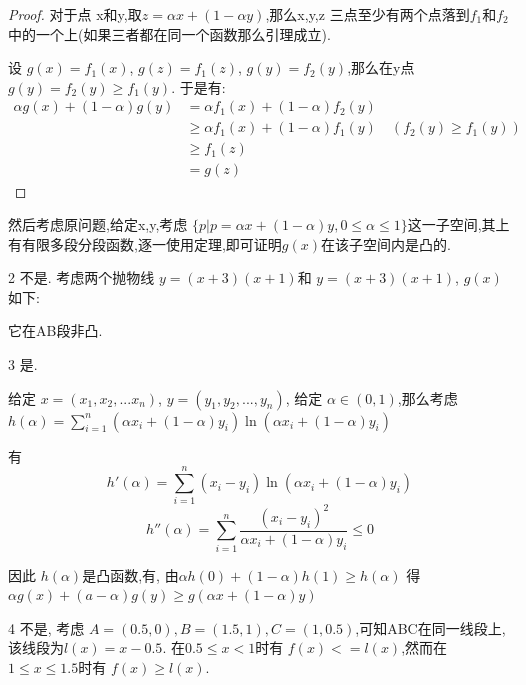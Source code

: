 \documentclass[a4paper]{article}
\begin{document}
\begin{proof}
对于点 x和y,取$z = \alpha x + (1-\alpha y)$,那么x,y,z 三点至少有两个点落到$f_1$和$f_2$中的一个上(如果三者都在同一个函数那么引理成立).

设 $g(x) = f_1(x)$, $g(z) = f_1(z)$, $g(y) = f_2(y)$,那么在y点 $g(y) = f_2(y) \geq f_1(y)$. 于是有:
\[
\begin{aligned}
     \alpha g(x) + (1-\alpha) g(y)  & =   \alpha f_1(x) + (1-\alpha) f_2(y) \\
   & \geq   \alpha f_1(x) + (1-\alpha) f_1(y)\quad (f_2(y) \geq f_1(y)) \\
   & \geq  f_1(z)  \\
    &=   g(z) 
\end{aligned}
\]

\end{proof}


然后考虑原问题,给定x,y,考虑 $\{ p | p = \alpha x + (1-\alpha)y, 0\leq \alpha \leq 1\}$这一子空间,其上有有限多段分段函数,逐一使用定理,即可证明$g(x)$在该子空间内是凸的.

2 不是. 考虑两个抛物线 $y = (x+3)(x+1)$和 $y = (x+3)(x+1)$, $g(x)$如下:


它在AB段非凸. 

3 是.

给定 $x = (x_1,x_2 , ... x_n)$, $y = (y_1,y_2,...,y_n)$, 给定 $\alpha \in (0,1)$,那么考虑 $h(\alpha) = \sum_{i=1}^n (\alpha x_i + (1-\alpha) y_i) \ln (\alpha x_i + (1-\alpha) y_i)$ 

有
\[h'(\alpha) = \sum_{i=1}^n (x_i - y_i) \ln (\alpha x_i + (1-\alpha) y_i)\]
\[h''(\alpha) = \sum_{i=1}^n \frac{(x_i - y_i)^2} {\alpha x_i + (1-\alpha) y_i} \leq 0\]

因此 $h(\alpha)$是凸函数,有, 由$\alpha h(0) + (1-\alpha) h(1) \geq h(\alpha)$ 得 $\alpha g(x) +(a-\alpha)g(y) \geq g(\alpha x + (1-\alpha) y)$



4 不是, 考虑 $A=(0.5,0), B = (1.5,1),C = (1,0.5)$,可知ABC在同一线段上,该线段为$l(x)= x - 0.5$. 在$0.5 \leq x < 1$时有 $f(x) <= l(x)$,然而在 $1 \leq x \leq 1.5$时有 $f(x) \geq l(x)$.
\end{document}

